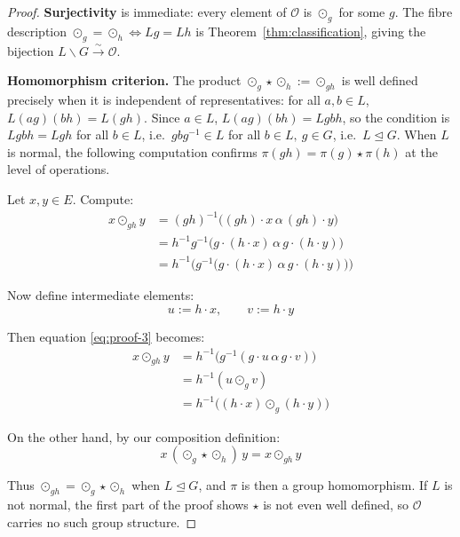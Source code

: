 \documentclass[11pt,a4paper,openany]{book}
\theoremstyle{plain}
\theoremstyle{definition}
\newcommand{\twing}[1]{\odot_{#1}}
\newcommand{\opspace}{\mathcal{O}}
\newcommand{\lingroup}{L}
\newcommand{\actspace}{E}
\newcommand{\groupG}{G}
\begin{document}
\begin{proof}
\textbf{Surjectivity} is immediate: every element of $\opspace$ is $\twing{g}$ for some $g$. The fibre description $\twing{g}=\twing{h}\iff \lingroup g=\lingroup h$ is Theorem~\ref{thm:classification}, giving the bijection $\lingroup\backslash\groupG\xrightarrow{\sim}\opspace$.

\textbf{Homomorphism criterion.} The product $\twing{g}\star\twing{h}:=\twing{gh}$ is well defined precisely when it is independent of representatives: for all $a,b\in\lingroup$, $\lingroup(ag)(bh)=\lingroup(gh)$. Since $a\in\lingroup$, $\lingroup(ag)(bh)=\lingroup gbh$, so the condition is $\lingroup gbh=\lingroup gh$ for all $b\in\lingroup$, i.e.\ $gbg^{-1}\in\lingroup$ for all $b\in\lingroup,\ g\in\groupG$, i.e.\ $\lingroup\trianglelefteq\groupG$. When $\lingroup$ is normal, the following computation confirms $\pi(gh)=\pi(g)\star\pi(h)$ at the level of operations.

Let $x, y \in \actspace$. Compute:
\begin{align}
x \twing{gh} y &= (gh)^{-1}\big((gh) \cdot x \,\alpha\, (gh) \cdot y\big) \label{eq:proof-1}\\
&= h^{-1}g^{-1}\big(g \cdot (h \cdot x) \,\alpha\, g \cdot (h \cdot y)\big) \label{eq:proof-2}\\
&= h^{-1}\big(g^{-1}\big(g \cdot (h \cdot x) \,\alpha\, g \cdot (h \cdot y)\big)\big) \label{eq:proof-3}
\end{align}

Now define intermediate elements:
\[
u := h \cdot x, \qquad v := h \cdot y
\]

Then equation \eqref{eq:proof-3} becomes:
\begin{align}
x \twing{gh} y &= h^{-1}\big(g^{-1}(g \cdot u \,\alpha\, g \cdot v)\big) \label{eq:proof-4}\\
&= h^{-1}(u \twing{g} v) \label{eq:proof-5}\\
&= h^{-1}\big((h \cdot x) \twing{g} (h \cdot y)\big) \label{eq:proof-6}
\end{align}

On the other hand, by our composition definition:
\[
x \,(\twing{g} \star \twing{h})\, y = x \twing{gh} y
\]

Thus $\twing{gh} = \twing{g} \star \twing{h}$ when $\lingroup\trianglelefteq\groupG$, and $\pi$ is then a group homomorphism. If $\lingroup$ is not normal, the first part of the proof shows $\star$ is not even well defined, so $\opspace$ carries no such group structure.
\end{proof}
\end{document}

